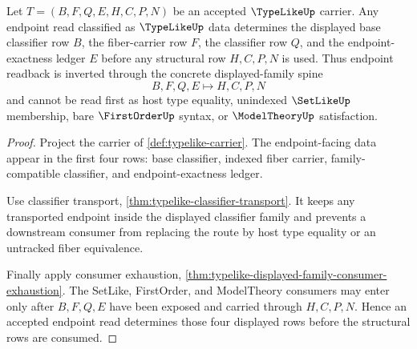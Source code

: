 \begin{theorem}
\label{thm:typelike-displayed-family-inversion}
Let $T=(B,F,Q,E,H,C,P,N)$ be an accepted $\TypeLikeUp$ carrier. Any endpoint read classified as $\TypeLikeUp$ data determines the displayed base classifier row $B$, the fiber-carrier row $F$, the classifier row $Q$, and the endpoint-exactness ledger $E$ before any structural row $H,C,P,N$ is used. Thus endpoint readback is inverted through the concrete displayed-family spine
$$
B,F,Q,E \longmapsto H,C,P,N
$$
and cannot be read first as host type equality, unindexed $\SetLikeUp$ membership, bare $\FirstOrderUp$ syntax, or $\ModelTheoryUp$ satisfaction.
\end{theorem}
\begin{proof}
Project the carrier of \autoref{def:typelike-carrier}. The endpoint-facing data appear in the first four rows: base classifier, indexed fiber carrier, family-compatible classifier, and endpoint-exactness ledger.

Use classifier transport, \autoref{thm:typelike-classifier-transport}. It keeps any transported endpoint inside the displayed classifier family and prevents a downstream consumer from replacing the route by host type equality or an untracked fiber equivalence.

Finally apply consumer exhaustion, \autoref{thm:typelike-displayed-family-consumer-exhaustion}. The SetLike, FirstOrder, and ModelTheory consumers may enter only after $B,F,Q,E$ have been exposed and carried through $H,C,P,N$. Hence an accepted endpoint read determines those four displayed rows before the structural rows are consumed.
\end{proof}



